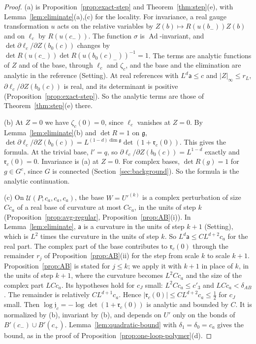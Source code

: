 \begin{proof}
(a) is Proposition~\ref{prop:exact-step} and Theorem~\ref{thm:step}(e), with Lemma~\ref{lem:eliminate}(a),(c) for the locality. For invariance, a real gauge transformation $u$ acts on the relative variables by $Z(b)\mapsto R(u(b_-))Z(b)$ and on $\ell_c$ by $R(u(c_-))$. The function $\sigma$ is $\operatorname{Ad}$-invariant, and $\det\partial\ell_c/\partial Z(b_0(c))$ changes by $\det R(u(c_-))\det R(u(b_0(c)_-))^{-1}=1$. The terms are analytic functions of $Z$ and of the base, through $\ell_c$ and $\zeta_c$, and the base and the elimination are analytic in the reference (Setting). At real references with $L^d\mathsf a\le c$ and $|Z|_\infty\le r_L$, $\partial\ell_c/\partial Z(b_0(c))$ is real, and its determinant is positive (Proposition~\ref{prop:exact-step}). So the analytic terms are those of Theorem~\ref{thm:step}(e) there.

(b) At $Z=0$ we have $\zeta_c(0)=0$, since $\ell_c$ vanishes at $Z=0$. By Lemma~\ref{lem:eliminate}(b) and $\det R=1$ on $\mathfrak g$, $\det\partial\ell_c/\partial Z(b_0(c))=L^{(1-d)\dim\mathfrak g}\det(1+\mathfrak r_c(0))$. This gives the formula. At the trivial base, $l'=q$, so $\partial\ell_c/\partial Z(b_0(c))=L^{1-d}$ exactly and $\mathfrak r_c(0)=0$. Invariance is (a) at $Z=0$. For complex bases, $\det R(g)=1$ for $g\in G^c$, since $G$ is connected (Section~\ref{sec:background}). So the formula is the analytic continuation.

(c) On $\mathcal U(P;c_a,c_a,c_a)$, the base $W=U'^{(k)}$ is a complex perturbation of size $Cc_a$ of a real base of curvature at most $Cc_a$, in the units of step $k$ (Proposition~\ref{prop:avg-regular}, Proposition~\ref{prop:AB}(i)). In Lemma~\ref{lem:eliminate}, $\mathsf a$ is a curvature in the units of step $k+1$ (Setting), which is $L^2$ times the curvature in the units of step $k$. So $L^d\mathsf a\le CL^{d+2}c_a$ for the real part. The complex part of the base contributes to $\mathfrak r_c(0)$ through the remainder $r_j$ of Proposition~\ref{prop:AB}(ii) for the step from scale $k$ to scale $k+1$. Proposition~\ref{prop:AB} is stated for $j\le k$; we apply it with $k+1$ in place of $k$, in the units of step $k+1$, where the curvature becomes $L^2Cc_a$ and the size of the complex part $LCc_a$. Its hypotheses hold for $c_J$ small: $L^2Cc_a\le c'_3$ and $LCc_a<\delta_{AB}$. The remainder is relatively $CL^{d+1}c_a$. Hence $|\mathfrak r_c(0)|\le CL^{d+2}c_a\le\frac12$ for $c_J$ small. Then $\log\mathfrak j_c=-\log\det(1+\mathfrak r_c(0))$ is analytic and bounded by $C$. It is normalized by (b), invariant by (b), and depends on $U'$ only on the bonds of $B'(c_-)\cup B'(c_+)$. Lemma~\ref{lem:quadratic-bound} with $\delta_1=\delta_0=c_a$ gives the bound, as in the proof of Proposition~\ref{prop:one-loop-polymer}(d).
\end{proof}

